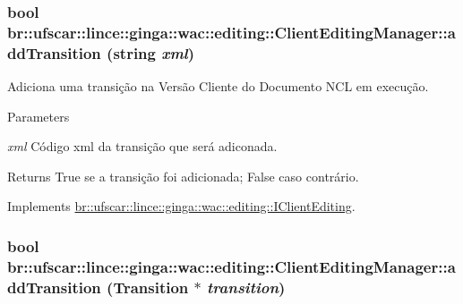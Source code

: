 \hypertarget{classbr_1_1ufscar_1_1lince_1_1ginga_1_1wac_1_1editing_1_1ClientEditingManager_a474cdd2a429ab96cb5376264ff38fa31}{
\subsubsection[{addTransition}]{\setlength{\rightskip}{0pt plus 5cm}bool br::ufscar::lince::ginga::wac::editing::ClientEditingManager::addTransition (string {\em xml})}}
\label{classbr_1_1ufscar_1_1lince_1_1ginga_1_1wac_1_1editing_1_1ClientEditingManager_a474cdd2a429ab96cb5376264ff38fa31}


Adiciona uma transição na Versão Cliente do Documento NCL em execução. 


\begin{DoxyParams}{Parameters}
\item[{\em xml}]Código xml da transição que será adiconada. \end{DoxyParams}
\begin{DoxyReturn}{Returns}
True se a transição foi adicionada; False caso contrário. 
\end{DoxyReturn}


Implements \hyperlink{classbr_1_1ufscar_1_1lince_1_1ginga_1_1wac_1_1editing_1_1IClientEditing_ab485ec1908e00b24e451f138446885af}{br::ufscar::lince::ginga::wac::editing::IClientEditing}.

\hypertarget{classbr_1_1ufscar_1_1lince_1_1ginga_1_1wac_1_1editing_1_1ClientEditingManager_af872bea61e20e96b7ef968e24627d8c7}{
\subsubsection[{addTransition}]{\setlength{\rightskip}{0pt plus 5cm}bool br::ufscar::lince::ginga::wac::editing::ClientEditingManager::addTransition (Transition $\ast$ {\em transition})}}
\label{classbr_1_1ufscar_1_1lince_1_1ginga_1_1wac_1_1editing_1_1ClientEditingManager_af872bea61e20e96b7ef968e24627d8c7}


